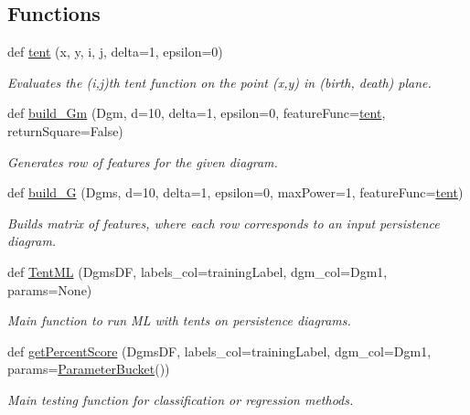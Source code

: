 \subsection*{Functions}
\begin{DoxyCompactItemize}
\item 
def \hyperlink{namespaceteaspoon_1_1_m_l_1_1tents_a7e54522bba1f674736551ec0522828fa}{tent} (x, y, i, j, delta=1, epsilon=0)
\begin{DoxyCompactList}\small\item\em Evaluates the (i,j)th tent function on the point (x,y) in (birth, death) plane. \end{DoxyCompactList}\item 
def \hyperlink{namespaceteaspoon_1_1_m_l_1_1tents_ac230b402d60eb765d2c2776027afaaa9}{build\+\_\+\+Gm} (Dgm, d=10, delta=1, epsilon=0, feature\+Func=\hyperlink{namespaceteaspoon_1_1_m_l_1_1tents_a7e54522bba1f674736551ec0522828fa}{tent}, return\+Square=False)
\begin{DoxyCompactList}\small\item\em Generates row of features for the given diagram. \end{DoxyCompactList}\item 
def \hyperlink{namespaceteaspoon_1_1_m_l_1_1tents_a19cc99365f3d375bf1ea7535095c15e3}{build\+\_\+G} (Dgms, d=10, delta=1, epsilon=0, max\+Power=1, feature\+Func=\hyperlink{namespaceteaspoon_1_1_m_l_1_1tents_a7e54522bba1f674736551ec0522828fa}{tent})
\begin{DoxyCompactList}\small\item\em Builds matrix of features, where each row corresponds to an input persistence diagram. \end{DoxyCompactList}\item 
def \hyperlink{namespaceteaspoon_1_1_m_l_1_1tents_aedb3c3fb1a8c0faa8bbe358db170f5bb}{Tent\+ML} (Dgms\+DF, labels\+\_\+col=\textquotesingle{}training\+Label\textquotesingle{}, dgm\+\_\+col=\textquotesingle{}Dgm1\textquotesingle{}, params=None)
\begin{DoxyCompactList}\small\item\em Main function to run ML with tents on persistence diagrams. \end{DoxyCompactList}\item 
def \hyperlink{namespaceteaspoon_1_1_m_l_1_1tents_a90cc7e8be9f3e13ef4528d1239fda660}{get\+Percent\+Score} (Dgms\+DF, labels\+\_\+col=\textquotesingle{}training\+Label\textquotesingle{}, dgm\+\_\+col=\textquotesingle{}Dgm1\textquotesingle{}, params=\hyperlink{classteaspoon_1_1_m_l_1_1tents_1_1_parameter_bucket}{Parameter\+Bucket}())
\begin{DoxyCompactList}\small\item\em Main testing function for classification or regression methods. \end{DoxyCompactList}\end{DoxyCompactItemize}



